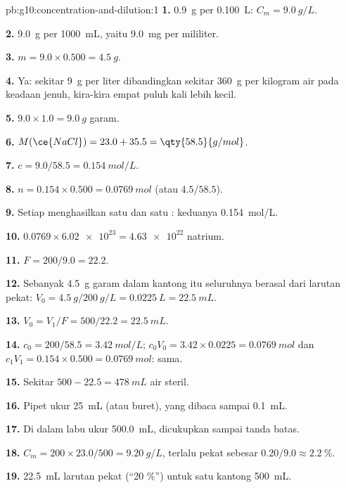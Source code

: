 \begin{solution}{pb:g10:concentration-and-dilution:1}
\textbf{1.} \qty{0.9}{g} per \qty{0.100}{L}: $C_m = \qty{9.0}{g/L}$.

\textbf{2.} \qty{9.0}{g} per \qty{1000}{mL}, yaitu \qty{9.0}{mg} per
mililiter.

\textbf{3.} $m = 9.0 \times 0.500 = \qty{4.5}{g}$.

\textbf{4.} Ya: sekitar \qty{9}{g} per liter dibandingkan sekitar
\qty{360}{g} per kilogram air pada keadaan jenuh, kira-kira empat puluh
kali lebih kecil.

\textbf{5.} $9.0 \times 1.0 = \qty{9.0}{g}$ garam.

\textbf{6.} $M(\ce{NaCl}) = 23.0 + 35.5 = \qty{58.5}{g/mol}$.

\textbf{7.} $c = 9.0 / 58.5 = \qty{0.154}{mol/L}$.

\textbf{8.} $n = 0.154 \times 0.500 = \qty{0.0769}{mol}$ (atau
$4.5 / 58.5$).

\textbf{9.} Setiap  menghasilkan satu  dan satu
: keduanya \qty{0.154}{mol/L}.

\textbf{10.} $0.0769 \times \num{6.02e23} = \num{4.63e22}$  natrium.

\textbf{11.} $F = 200 / 9.0 = 22.2$.

\textbf{12.} Sebanyak \qty{4.5}{g} garam dalam kantong itu seluruhnya
berasal dari larutan pekat: $V_0 = \qty{4.5}{g} / \qty{200}{g/L} = \qty{0.0225}{L} =
\qty{22.5}{mL}$.

\textbf{13.} $V_0 = V_1 / F = 500 / 22.2 = \qty{22.5}{mL}$.

\textbf{14.} $c_0 = 200 / 58.5 = \qty{3.42}{mol/L}$;
$c_0 V_0 = 3.42 \times 0.0225 = \qty{0.0769}{mol}$ dan
$c_1 V_1 = 0.154 \times 0.500 = \qty{0.0769}{mol}$: sama.

\textbf{15.} Sekitar $500 - 22.5 = \qty{478}{mL}$ air steril.

\textbf{16.} Pipet ukur \qty{25}{mL} (atau buret), yang dibaca sampai
\qty{0.1}{mL}.

\textbf{17.} Di dalam labu ukur \qty{500.0}{mL}, dicukupkan sampai tanda
batas.

\textbf{18.} $C_m = 200 \times 23.0 / 500 = \qty{9.20}{g/L}$, terlalu
pekat sebesar $0.20 / 9.0 \approx \qty{2.2}{\percent}$.

\textbf{19.} \qty{22.5}{mL} larutan pekat (``20 \%'') untuk satu kantong
\qty{500}{mL}.
\end{solution}
